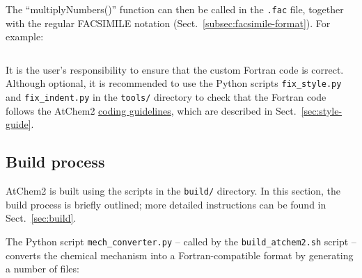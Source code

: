 The ``multiplyNumbers()'' function can then be called in the \texttt{.fac} file, together with
the regular FACSIMILE notation (Sect.~\ref{subsec:facsimile-format}). For example:

\begin{Verbatim}[fontsize=\small]
  % multiplyNumbers(2.0, 0.5) : A = B ;
\end{Verbatim}

It is the user's responsibility to ensure that the custom Fortran code is correct. Although
optional, it is recommended to use the Python scripts \texttt{fix\_style.py} and
\texttt{fix\_indent.py} in the \texttt{tools/} directory to check that the Fortran code follows
the AtChem2 \hyperref[subsec:style-recommendations]{coding guidelines}, which are described in
Sect.~\ref{sec:style-guide}.

\subsection{Build process} \label{subsec:build-process}

AtChem2 is built using the scripts in the \texttt{build/} directory. In this section, the build
process is briefly outlined; more detailed instructions can be found in Sect.~\ref{sec:build}.

The Python script \texttt{mech\_converter.py} -- called by the \texttt{build\_atchem2.sh}
script -- converts the chemical mechanism into a Fortran-compatible format by generating a
number of files:

